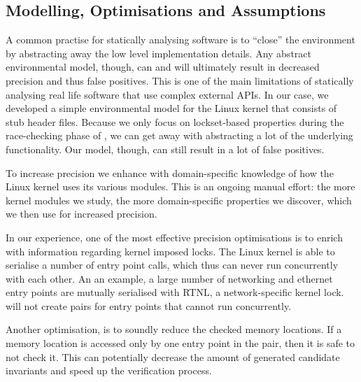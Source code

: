 
\subsection{Modelling, Optimisations and Assumptions}
\label{tech:optimisations}

A common practise for statically analysing software is to ``close'' the environment by abstracting away the low level implementation details. Any abstract environmental model, though, can and will ultimately result in decreased precision and thus false positives. This is one of the main limitations of statically analysing real life software that use complex external APIs. In our case, we developed a simple environmental model for the Linux kernel that consists of stub header files. Because we only focus on lockset-based properties during the race-checking phase of \whoop, we can get away with abstracting a lot of the underlying functionality. Our model, though, can still result in a lot of false positives.

To increase precision we enhance \whoop with domain-specific knowledge of how the Linux kernel uses its various modules. This is an ongoing manual effort: the more kernel modules we study, the more domain-specific properties we discover, which we then use for increased precision.

In our experience, one of the most effective precision optimisations is to enrich \whoop with information regarding kernel imposed locks. The Linux kernel is able to serialise a number of entry point calls, which thus can never run concurrently with each other. An an example, a large number of networking and ethernet entry points are mutually serialised with RTNL, a network-specific kernel lock. \whoop will not create pairs for entry points that cannot run concurrently.

Another optimisation, is to soundly reduce the checked memory locations. If a memory location is accessed only by one entry point in the pair, then it is safe to not check it. This can potentially decrease the amount of generated candidate invariants and speed up the verification process.

